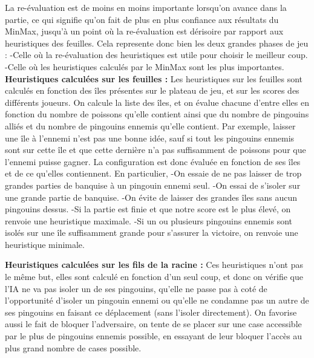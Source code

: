 \documentclass{report}
\begin{document}
\vspace{0.7cm}
La re-évaluation est de moins en moins importante lorsqu'on avance dans la partie, ce qui signifie qu'on fait de plus en plus confiance aux résultats du MinMax, jusqu'à un point où la re-évaluation est dérisoire par rapport aux heuristiques des feuilles.
\newline
Cela represente donc bien les deux grandes phases de jeu :
\newline
-Celle où la re-évaluation des heuristiques est utile pour choisir le meilleur coup.
-Celle où les heuristiques calculés par le MinMax sont les plus importantes.
\newpage
\textbf{Heuristiques calculées sur les feuilles :}
\newline
Les heuristiques sur les feuilles sont calculés en fonction des îles présentes sur le plateau de jeu, et sur les scores des différents joueurs.
\newline
On calcule la liste des îles, et on évalue chacune d'entre elles en fonction du nombre de poissons qu'elle contient ainsi que du nombre de pingouins alliés et du nombre de pingouins ennemis qu'elle contient.
\newline
Par exemple, laisser une île à l'ennemi n'est pas une bonne idée, sauf si tout les pingouins ennemis sont sur cette île et que cette dernière n'a pas suffisamment de poissons pour que l'ennemi puisse gagner.
\newline 
La configuration est donc évaluée en fonction de ses îles et de ce qu'elles contiennent.
\newline 
En particulier,
\newline
-On essaie de ne pas laisser de trop grandes parties de banquise à un pingouin ennemi seul.
\newline
-On essai de s'isoler sur une grande partie de banquise. 
\newline
-On évite de laisser des grandes îles sans aucun pingouins dessus. 
\newline
-Si la partie est finie et que notre score est le plus élevé, on renvoie une heuristique maximale.
\newline
-Si un ou plusieurs pingouins ennemis sont isolés sur une île suffisamment grande pour s'assurer la victoire, on renvoie une heuristique minimale.

\vspace{0.3cm}
\textbf{Heuristiques calculées sur les fils de la racine :}
\newline
Ces heuristiques n'ont pas le même but, elles sont calculé en fonction d'un seul coup, et donc on vérifie que l'IA ne va pas isoler un de ses pingouins, qu'elle ne passe pas à coté de l'opportunité d'isoler un pingouin ennemi ou qu'elle ne condamne pas un autre de ses pingouins en faisant ce déplacement (sans l'isoler directement).
\newline
On favorise aussi le fait de bloquer l'adversaire, on tente de se placer sur une case accessible par le plus de pingouins ennemis possible, en essayant de leur bloquer l'accès au plus grand nombre de cases possible.
\vspace{0.3cm}
\end{document}
